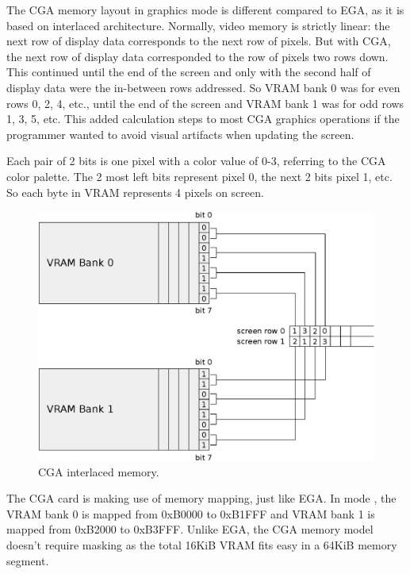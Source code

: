 \documentclass[book.tex]{subfiles}
\begin{document}
The CGA memory layout in graphics mode is different compared to EGA, as it is based on interlaced architecture.
Normally, video memory is strictly linear: the next row of display data corresponds to the next row of pixels. But with CGA, the next row of display data corresponded to the row of pixels two rows down. This continued until the end of the screen and only with the second half of display data were the in-between rows addressed. So VRAM bank 0 was for even rows 0, 2, 4, etc., until the end of the screen and VRAM bank 1 was for odd rows 1, 3, 5, etc. This added calculation steps to most CGA graphics operations if the programmer wanted to avoid visual artifacts when updating the screen.\\
\par
Each pair of 2 bits is one pixel with a color value of 0-3, referring to the CGA color palette. The 2 most left bits represent pixel 0, the next 2 bits pixel 1, etc. So each byte in VRAM represents 4 pixels on screen. \\






\begin{figure}[H]
\centering
\includegraphics[width=1.0\textwidth]{imgs/drawings/cga_interlace.eps}
\caption{CGA interlaced memory.}
\label{fig:cga_interlaced}
\end{figure}


\par
The CGA card is making use of memory mapping, just like EGA. In mode , the VRAM bank 0 is mapped from 0xB0000 to 0xB1FFF and VRAM bank 1 is mapped from 0xB2000 to 0xB3FFF. Unlike EGA, the CGA memory model doesn't require masking as the total 16KiB VRAM fits easy in a 64KiB memory segment.\\ 
\end{document}
